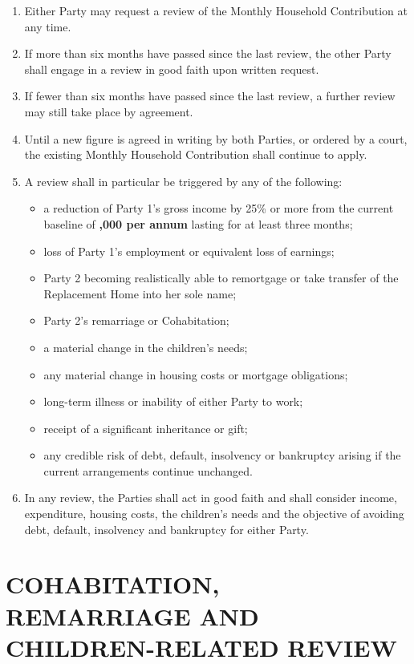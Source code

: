 \documentclass[10pt,a4paper]{article}
\begin{document}
\begin{enumerate}[label=\arabic*., start=38, leftmargin=1.8em]
    \item Either Party may request a review of the Monthly Household Contribution at any time.
    \item If more than six months have passed since the last review, the other Party shall engage in a review in good faith upon written request.
    \item If fewer than six months have passed since the last review, a further review may still take place by agreement.
    \item Until a new figure is agreed in writing by both Parties, or ordered by a court, the existing Monthly Household Contribution shall continue to apply.
    \item A review shall in particular be triggered by any of the following:
    \begin{itemize}[leftmargin=1.8em]
        \item a reduction of Party 1's gross income by 25\% or more from the current baseline of \textbf{,000 per annum} lasting for at least three months;
        \item loss of Party 1's employment or equivalent loss of earnings;
        \item Party 2 becoming realistically able to remortgage or take transfer of the Replacement Home into her sole name;
        \item Party 2's remarriage or Cohabitation;
        \item a material change in the children's needs;
        \item any material change in housing costs or mortgage obligations;
        \item long-term illness or inability of either Party to work;
        \item receipt of a significant inheritance or gift;
        \item any credible risk of debt, default, insolvency or bankruptcy arising if the current arrangements continue unchanged.
    \end{itemize}
    \item In any review, the Parties shall act in good faith and shall consider income, expenditure, housing costs, the children's needs and the objective of avoiding debt, default, insolvency and bankruptcy for either Party.
\end{enumerate}

\section*{COHABITATION, REMARRIAGE AND CHILDREN-RELATED REVIEW}
\end{document}
